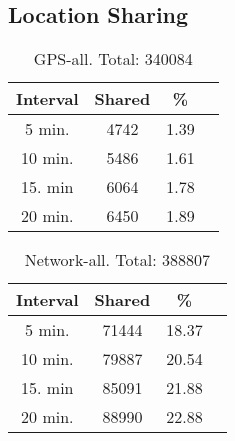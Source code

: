 \subsection{Location Sharing}
\label{subsec-locationsharing}

\begin{table}
	\centering
		\begin{tabular}{|c|c|c|c|}\hline
		\textbf{Interval} & \textbf{Shared} & \textbf{\%}\\\hline\hline
		5 min. & 4742 & 1.39\\\hline\hline
		10 min. & 5486 & 1.61\\\hline
		15. min & 6064 & 1.78\\\hline
		20 min. & 6450 & 1.89\\\hline
		\end{tabular}
	\caption{GPS-all. Total: 340084 }
	\label{tab:gps_sharing}
\end{table}

\begin{table}
	\centering
		\begin{tabular}{|c|c|c|c|}\hline
		\textbf{Interval} & \textbf{Shared} & \textbf{\%}\\\hline\hline
		5 min. & 71444 & 18.37\\\hline\hline
		10 min. & 79887 & 20.54\\\hline
		15. min & 85091 & 21.88\\\hline
		20 min. & 88990 &  22.88\\\hline
		\end{tabular}
	\caption{Network-all. Total: 388807}
	\label{tab:network_sharing}
\end{table}
